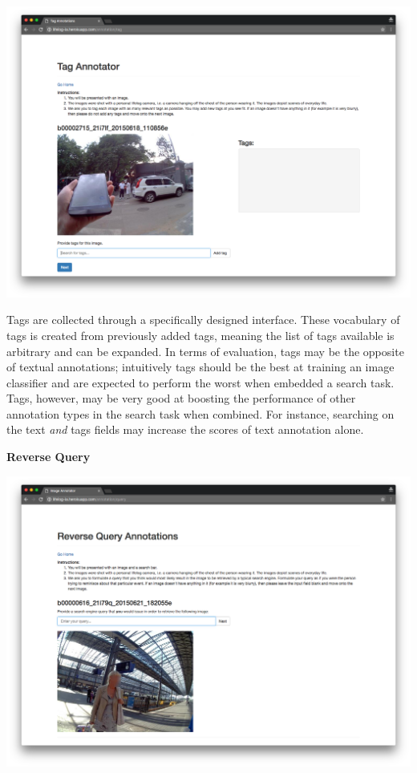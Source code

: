 \documentclass[12pt,a4paper]{article}
\begin{document}
\includegraphics[width=\textwidth]{images/tag-interface}

Tags are collected through a specifically designed interface. These vocabulary of tags is created from previously added tags, meaning the list of tags available is arbitrary and can be expanded. In terms of evaluation, tags may be the opposite of textual annotations; intuitively tags should be the best at training an image classifier and are expected to perform the worst when embedded a search task. Tags, however, may be very good at boosting the performance of other annotation types in the search task when combined. For instance, searching on the text \textit{and} tags fields may increase the scores of text annotation alone.

\newpage
\textbf{Reverse Query}

\includegraphics[width=\textwidth]{images/query-interface}
\end{document}
